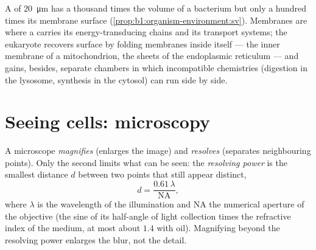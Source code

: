 \begin{example}\label{ex:b1:cell-unit-of-life:whycompart}
A  of \qty{20}{\micro m} has a thousand times the volume of a
bacterium but only a hundred times its membrane surface
(\cref{prop:b1:organism-environment:sv}). Membranes are where a 
carries its energy-transducing chains and its transport systems; the
eukaryote recovers surface by folding membranes inside itself --- the
inner membrane of a mitochondrion, the sheets of the endoplasmic
reticulum --- and gains, besides, separate chambers in which
incompatible chemistries (digestion in the lysosome, synthesis in the
cytosol) can run side by side.
\end{example}

\section{Seeing cells: microscopy}

\begin{definition}\label{def:b1:cell-unit-of-life:resolution}
A microscope \emph{magnifies} (enlarges the image)
and \emph{resolves} (separates neighbouring points).
Only the second limits what can be seen: the \emph{resolving
power} is the smallest distance $d$ between two
points that still appear distinct,
\[
d = \frac{0.61\,\lambda}{\mathrm{NA}},
\]
where $\lambda$ is the wavelength of the illumination and $\mathrm{NA}$
the numerical aperture of the objective (the sine of its half-angle of
light collection times the refractive index of the medium, at most
about $1.4$ with oil). Magnifying beyond the resolving power enlarges
the blur, not the detail.
\end{definition}

